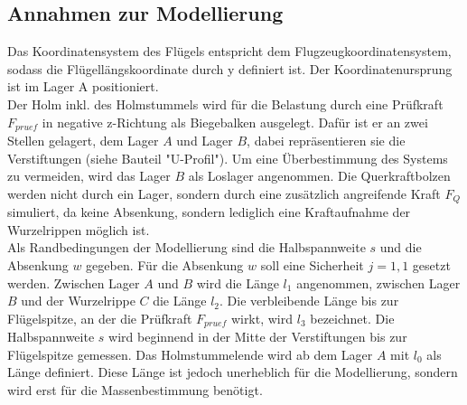 \subsection{Annahmen zur Modellierung}
Das Koordinatensystem des Flügels entspricht dem Flugzeugkoordinatensystem, sodass die Flügellängskoordinate durch y definiert ist. Der Koordinatenursprung ist im Lager A positioniert. \\

\noindent Der Holm inkl. des Holmstummels wird für die Belastung durch eine Prüfkraft $F_{pruef}$ in negative z-Richtung als Biegebalken ausgelegt. Dafür ist er an zwei Stellen gelagert, dem Lager $A$ und Lager $B$, dabei repräsentieren sie die Verstiftungen (siehe Bauteil "U-Profil"). Um eine Überbestimmung des Systems zu vermeiden, wird das Lager $B$ als Loslager angenommen. Die Querkraftbolzen werden nicht durch ein Lager, sondern durch eine zusätzlich angreifende Kraft $F_{Q}$ simuliert, da keine Absenkung, sondern lediglich eine Kraftaufnahme der Wurzelrippen möglich ist. \\

\noindent Als Randbedingungen der Modellierung sind die Halbspannweite $s$ und die Absenkung $w$ gegeben. Für die Absenkung $w$ soll eine Sicherheit $j=1,1$ gesetzt werden. Zwischen Lager $A$ und $B$ wird die Länge $l_{1}$ angenommen, zwischen Lager $B$ und der Wurzelrippe $C$ die Länge $l_{2}$. Die verbleibende Länge bis zur Flügelspitze, an der die Prüfkraft $F_{pruef}$ wirkt, wird $l_{3}$ bezeichnet. Die Halbspannweite $s$ wird beginnend in der Mitte der Verstiftungen bis zur Flügelspitze gemessen. Das Holmstummelende wird ab dem Lager $A$ mit $l_{0}$ als Länge definiert. Diese Länge ist jedoch unerheblich für die Modellierung, sondern wird erst für die Massenbestimmung benötigt.\\

